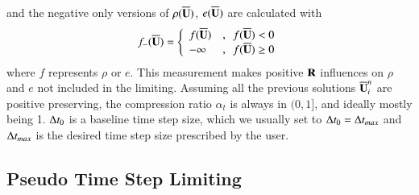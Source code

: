 and the negative only versions of $\rho(\overline{\mathbf{U}})$, $e(\overline{\mathbf{U}})$
are calculated with
\begin{equation}
    f_-(\overline{\mathbf{U}}) =
    \left\{
    \begin{array}{ll}
        f(\overline{\mathbf{U}})  & ,\ \   f(\overline{\mathbf{U}}) < 0    \\
        -\infty & ,\ \   f(\overline{\mathbf{U}}) \geq 0 \\
    \end{array}
    \right.
\end{equation}
where $f$ represents $\rho$ or $e$.
This measurement makes positive $\mathbf{R}$ influences
on $\rho$ and $e$ not included in the limiting.
Assuming all the previous solutions $\overline{\mathbf{U}}^n_i$ 
are positive preserving,
the compression ratio $\alpha_t$ is always in 
$(0,1]$, and ideally mostly being 1.  
$\mathrm\Delta t_0$ is a baseline time step size, which 
we usually set to $\mathrm\Delta t_0 = \mathrm\Delta t_{max}$
and $\mathrm\Delta t_{max}$ is the desired time step size
prescribed by the user.

\subsection{Pseudo Time Step Limiting}

